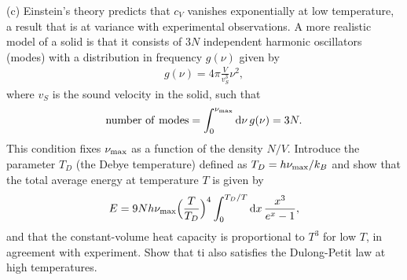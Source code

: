 {(c) Einstein's theory predicts that $c_{V}$ vanishes exponentially at low temperature, a result that is at variance with experimental observations.
A more realistic model of a solid is that it consists of $3N$ independent harmonic oscillators (modes) with a distribution in frequency $g(\nu)$ given by
\begin{eqnarray}
    g(\nu) = 4\pi \frac{V}{v_{S}^3} \nu^2
,\end{eqnarray}
where $v_{S}$ is the sound velocity in the solid, such that 
\begin{eqnarray}
    {\rm number~of~modes} = \int_{0}^{\nu_{\rm max}} \dd{\nu} g(\nu) = 3N
.\end{eqnarray}
This condition fixes $\nu_{\rm max}$ as a function of the density $N/V$.
Introduce the parameter $T_{D}$ (the Debye temperature) defined as $T_{D} = h \nu_{\rm max}/k_{B}$ and show that the total average energy at temperature $T$ is given by
\begin{eqnarray}
    E = 9 N h \nu_{\rm max} \Big( \frac{T}{T_{D}} \Big)^{4} \int_{0}^{T_{D}/T} \dd{x} \frac{x^3}{e^{x} - 1}
,\end{eqnarray}
and that the constant-volume heat capacity is proportional to $T^3$ for low $T$, in agreement with experiment.
Show that ti also satisfies the Dulong-Petit law at high temperatures.




}




